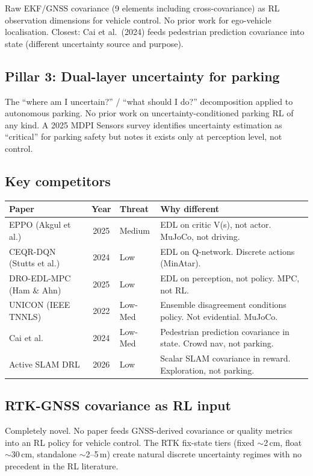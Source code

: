 \documentclass[11pt,a4paper]{article}
\begin{document}
Raw EKF/GNSS covariance (9 elements including cross-covariance) as RL
observation dimensions for vehicle control. No prior work for ego-vehicle
localisation. Closest: Cai et al.\ (2024) feeds pedestrian prediction
covariance into state (different uncertainty source and purpose).

\subsection{Pillar 3: Dual-layer uncertainty for parking}

The ``where am I uncertain?'' / ``what should I do?'' decomposition
applied to autonomous parking. No prior work on uncertainty-conditioned
parking RL of any kind. A 2025 MDPI Sensors survey identifies uncertainty
estimation as ``critical'' for parking safety but notes it exists only at
perception level, not control.

\subsection{Key competitors}

\begin{center}
\begin{longtable}{lclp{5.5cm}}
\toprule
Paper & Year & Threat & Why different \\
\midrule
EPPO (Akgul et al.) & 2025 & Medium & EDL on critic V(s), not actor. MuJoCo, not driving. \\
CEQR-DQN (Stutts et al.) & 2024 & Low & EDL on Q-network. Discrete actions (MinAtar). \\
DRO-EDL-MPC (Ham \& Ahn) & 2025 & Low & EDL on perception, not policy. MPC, not RL. \\
UNICON (IEEE TNNLS) & 2022 & Low-Med & Ensemble disagreement conditions policy. Not evidential. MuJoCo. \\
Cai et al. & 2024 & Low-Med & Pedestrian prediction covariance in state. Crowd nav, not parking. \\
Active SLAM DRL & 2026 & Low & Scalar SLAM covariance in reward. Exploration, not parking. \\
\bottomrule
\end{longtable}
\end{center}

\subsection{RTK-GNSS covariance as RL input}

Completely novel. No paper feeds GNSS-derived covariance or quality metrics
into an RL policy for vehicle control. The RTK fix-state tiers (fixed
$\sim$2\,cm, float $\sim$30\,cm, standalone $\sim$2--5\,m) create natural
discrete uncertainty regimes with no precedent in the RL literature.
\end{document}
